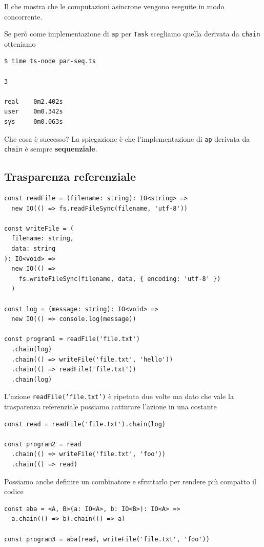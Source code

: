 \documentclass[12pt]{article}
\begin{document}
Il che mostra che le computazioni asincrone vengono eseguite in modo concorrente.

Se però come implementazione di \texttt{ap} per \texttt{Task} scegliamo quella derivata da \texttt{chain} otteniamo

\begin{verbatim}
$ time ts-node par-seq.ts

3

real    0m2.402s
user    0m0.342s
sys     0m0.063s
\end{verbatim}

Che cosa è successo? La spiegazione è che l'implementazione di \texttt{ap} derivata da \texttt{chain} è sempre \textbf{sequenziale}.

\subsection{Trasparenza referenziale}

\begin{verbatim}
const readFile = (filename: string): IO<string> =>
  new IO(() => fs.readFileSync(filename, 'utf-8'))

const writeFile = (
  filename: string,
  data: string
): IO<void> =>
  new IO(() =>
    fs.writeFileSync(filename, data, { encoding: 'utf-8' })
  )

const log = (message: string): IO<void> =>
  new IO(() => console.log(message))

const program1 = readFile('file.txt')
  .chain(log)
  .chain(() => writeFile('file.txt', 'hello'))
  .chain(() => readFile('file.txt'))
  .chain(log)
\end{verbatim}

L'azione \texttt{readFile('file.txt')} è ripetuta due volte ma dato che vale la trasparenza referenziale possiamo catturare l'azione in una costante

\begin{verbatim}
const read = readFile('file.txt').chain(log)

const program2 = read
  .chain(() => writeFile('file.txt', 'foo'))
  .chain(() => read)
\end{verbatim}

Possiamo anche definire un combinatore e sfruttarlo per rendere più compatto il codice

\begin{verbatim}
const aba = <A, B>(a: IO<A>, b: IO<B>): IO<A> =>
  a.chain(() => b).chain(() => a)

const program3 = aba(read, writeFile('file.txt', 'foo'))
\end{verbatim}
\end{document}
